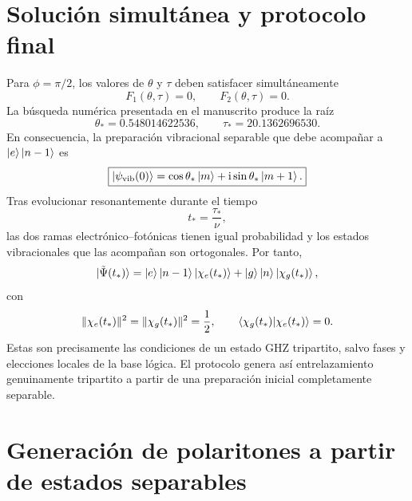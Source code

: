 \section{Soluci\'on simult\'anea y protocolo final}

Para $\phi=\pi/2$, los valores de $\theta$ y $\tau$ deben satisfacer
simult\'aneamente
\begin{equation}
  \boxed{
  F_1(\theta,\tau)=0,
  \qquad
  F_2(\theta,\tau)=0.
  }
\end{equation}
La b\'usqueda num\'erica presentada en el manuscrito produce la ra\'iz
\begin{equation}
  \boxed{
  \theta_*=0.548014622536,
  \qquad
  \tau_*=20.1362696530.
  }
\end{equation}
En consecuencia, la preparaci\'on vibracional separable que debe acompa\~nar a
$\ket e\ket{n-1}$ es
\begin{equation}
  \boxed{
  \ket{\psi_{\mathrm{vib}}(0)}
  =
  \cos\theta_*\ket m
  +\mathrm{i}\sin\theta_*\ket{m+1}.
  }
\end{equation}
Tras evolucionar resonantemente durante el tiempo
\begin{equation}
  t_*=\frac{\tau_*}{\nu},
\end{equation}
las dos ramas electr\'onico--fot\'onicas tienen igual probabilidad y los
estados vibracionales que las acompa\~nan son ortogonales. Por tanto,
\begin{equation}
  \ket{\tilde\Psi(t_*)}
  =
  \ket e\ket{n-1}\ket{\chi_e(t_*)}
  +
  \ket g\ket n\ket{\chi_g(t_*)},
\end{equation}
con
\begin{equation}
  \|\chi_e(t_*)\|^2
  =
  \|\chi_g(t_*)\|^2
  =
  \frac12,
  \qquad
  \braket{\chi_g(t_*)|\chi_e(t_*)}=0.
\end{equation}
Estas son precisamente las condiciones de un estado GHZ tripartito, salvo
fases y elecciones locales de la base l\'ogica. El protocolo genera as\'i
entrelazamiento genuinamente tripartito a partir de una preparaci\'on inicial
completamente separable.

\section{Generaci\'on de polaritones a partir de estados separables}

